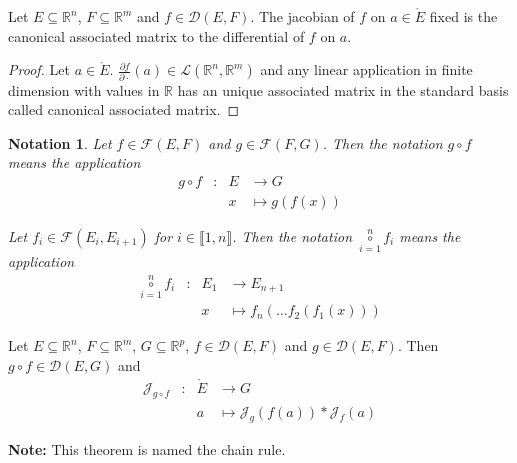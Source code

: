 \documentclass[11pt,en]{elegantpaper}
\newtheorem{notation}{Notation}
\newcommand{\Real}{\mathbb{R}}
\begin{document}
\begin{corollary}
  {\normalfont Let $E \subseteq \Real^n$, $F \subseteq \Real^m$ and $f \in \mathcal{D}(E,F)$.
  The jacobian of $f$ on $a \in \mathring{E}$ fixed is the canonical associated matrix to the differential of $f$ on $a$.} \par
   \par
\end{corollary}

\begin{proof}
  Let $a \in \mathring{E}$.
  $\frac{\partial f}{\partial \cdot}(a) \in \mathcal{L}(\Real^n,\Real^m)$ and any linear application in finite dimension
  with values in $\Real$ has an unique associated matrix in the standard basis called canonical associated matrix. \par
\end{proof}

\begin{notation}
  Let $f \in \mathcal{F}(E,F)$ and $g \in \mathcal{F}(F,G)$.
  Then the notation $g \circ f$ means the application \begin{equation*}
    \begin{array}{llll}
      g \circ f & : & E & \longrightarrow G \\
        &   & x & \longmapsto g(f(x))
    \end{array}
  \end{equation*} \par

  Let $f_i \in \mathcal{F}(E_i,E_{i+1})$ for $i \in \llbracket 1,n \rrbracket$.
  Then the notation $\underset{i=1}{\overset{n}\circ} f_i$ means the application \begin{equation*}
    \begin{array}{llll}
      \underset{i=1}{\overset{n}\circ} f_i & : & E_1 & \longrightarrow E_{n+1} \\
        &   & x & \longmapsto f_n( \ldots f_2(f_1(x)))
    \end{array}
  \end{equation*}
\end{notation}

\begin{theorem}
  {\normalfont
    Let $E \subseteq \Real^n$, $F \subseteq \Real^m$, $G \subseteq \Real^p$, $f \in \mathcal{D}(E,F)$ and $g \in \mathcal{D}(E,F)$.
    Then $g \circ f \in \mathcal{D}(E,G)$ and \begin{equation} \label{theo:chain_rule}
      \begin{array}{llll}
        \mathcal{J}_{g \circ f} & : & \mathring{E} & \longrightarrow G \\
        &   & a & \longmapsto \mathcal{J}_{g}(f(a)) * \mathcal{J}_{f}(a)
      \end{array}
    \end{equation} \par
    \textbf{Note:} This theorem is named the chain rule.
  }
\end{theorem}
\end{document}

